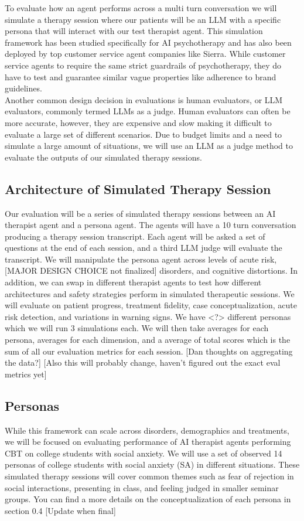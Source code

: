 \documentclass[twoside]{report}
\begin{document}
To evaluate how an agent performs across a multi turn conversation we will simulate a therapy session where our patients will be an LLM with a specific persona that will interact with our test therapist agent. This simulation framework has been studied specifically for AI psychotherapy and has also been deployed by top customer service agent companies like Sierra. While customer service agents to require the same strict guardrails of psychotherapy, they do have to test and guarantee similar vague properties like adherence to brand guidelines. \\

Another common design decision in evaluations is human evaluators, or LLM evaluators, commonly termed LLMs as a judge. Human evaluators can often be more accurate, however, they are expensive and slow making it difficult to evaluate a large set of different scenarios. Due to budget limits and a need to simulate a large amount of situations, we will use an LLM as a judge method to evaluate the outputs of our simulated therapy sessions. 

\subsection{Architecture of Simulated Therapy Session}
Our evaluation will be a series of simulated therapy sessions between an AI therapist agent and a persona agent. The agents will have a 10 turn conversation producing a therapy session transcript. Each agent will be asked a set of questions at the end of each session, and a third LLM judge will evaluate the transcript. We will manipulate the persona agent across levels of acute risk, [MAJOR DESIGN CHOICE not finalized] disorders, and cognitive distortions. In addition, we can swap in different therapist agents to test how different architectures and safety strategies perform in simulated therapeutic sessions. We will evaluate on patient progress, treatment fidelity, case conceptualization, acute risk detection, and variations in warning signs. We have <?> different personas which we will run 3 simulations each. We will then take averages for each persona, averages for each dimension, and a average of total scores which is the sum of all our evaluation metrics for each session. [Dan thoughts on aggregating the data?] [Also this will probably change, haven't figured out the exact eval metrics yet]

\subsection{Personas}
While this framework can scale across disorders, demographics and treatments, we will be focused on evaluating performance of AI therapist agents performing CBT on college students with social anxiety. We will use a set of observed 14 personas of college students with social anxiety (SA) in different situations. These simulated therapy sessions will cover common themes such as fear of rejection in social interactions, presenting in class, and feeling judged in smaller seminar groups. You can find a more details on the conceptualization of each persona in section 0.4 [Update when final]
\end{document}
